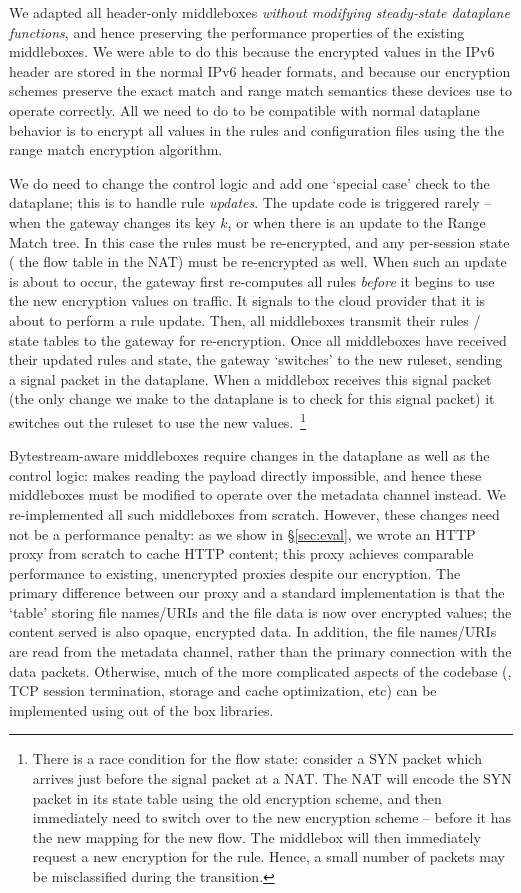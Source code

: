 We adapted all header-only middleboxes {\it without modifying steady-state dataplane functions}, and hence preserving the performance properties of the existing middleboxes.
We were able to do this because the encrypted values in the IPv6 header are stored in the normal IPv6 header formats, and because our encryption schemes preserve the exact match and range match semantics these devices use to operate correctly.
All we need to do to be compatible with normal dataplane behavior is to encrypt all values in the rules and configuration files using the the range match encryption algorithm.

We do need to change the control logic and add one `special case' check to the dataplane; this is to handle rule {\it updates}. 
The update code is triggered rarely -- when the gateway changes its key $k$, or when there is an update to the Range Match tree.
In this case the rules must be re-encrypted, and any per-session state (\eg{} the flow table in the NAT) must be re-encrypted as well.
When such an update is about to occur, the gateway first re-computes all rules {\it before} it begins to use the new encryption values on traffic. It signals to the cloud provider that it is about to perform a rule update. Then, all middleboxes transmit their rules / state tables to the gateway for re-encryption. 
Once all middleboxes have received their updated rules and state, the gateway `switches' to the new ruleset, sending a signal packet in the dataplane. When a middlebox receives this signal packet (the only change we make to the dataplane is to check for this signal packet) it switches out the ruleset to use the new values.~\footnote{\small There is a race condition for the flow state: consider a SYN packet which arrives just before the signal packet at a NAT. The NAT will encode the SYN packet in its state table using the old encryption scheme, and then immediately need to switch over to the new encryption scheme -- before it has the new mapping for the new flow. The middlebox will then immediately request a new encryption for the rule. Hence, a small number of packets may be misclassified during the transition.}

Bytestream-aware middleboxes require changes in the dataplane as well as the control logic: \sys makes reading the payload directly impossible, and hence these middleboxes must be modified to operate over the metadata channel instead.
We re-implemented all such middleboxes from scratch.
However, these changes need not be a performance penalty: as we show in \S\ref{sec:eval}, we wrote an HTTP proxy from scratch to cache HTTP content; this proxy achieves comparable performance to existing, unencrypted proxies despite our encryption.
The primary difference between our proxy and a standard implementation is that the `table' storing file names/URIs and the file data is now over encrypted values; the content served is also opaque, encrypted data. 
In addition, the file names/URIs are read from the metadata channel, rather than the primary connection with the data packets. 
Otherwise, much of the more complicated aspects of the codebase (\eg{}, TCP session termination, storage and cache optimization, etc) can be implemented using out of the box libraries.

